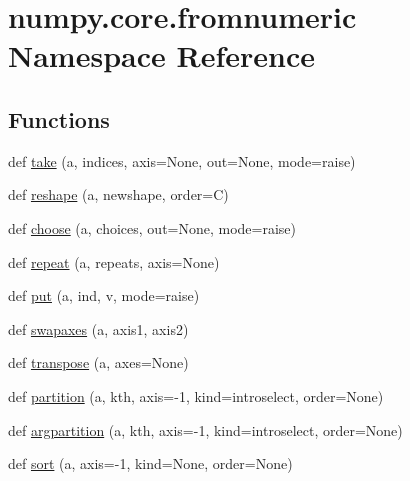 \hypertarget{namespacenumpy_1_1core_1_1fromnumeric}{}\section{numpy.\+core.\+fromnumeric Namespace Reference}
\label{namespacenumpy_1_1core_1_1fromnumeric}
\subsection*{Functions}
\begin{DoxyCompactItemize}
\item 
def \hyperlink{namespacenumpy_1_1core_1_1fromnumeric_a9ce1152680e42f10b320cc3bce091e82}{take} (a, indices, axis=None, out=None, mode=\textquotesingle{}raise\textquotesingle{})
\item 
def \hyperlink{namespacenumpy_1_1core_1_1fromnumeric_adc114e7baa60d8c41c25f59d83c8f731}{reshape} (a, newshape, order=\textquotesingle{}C\textquotesingle{})
\item 
def \hyperlink{namespacenumpy_1_1core_1_1fromnumeric_a8c4560c1ebb6f90c304bb49141f69ce3}{choose} (a, choices, out=None, mode=\textquotesingle{}raise\textquotesingle{})
\item 
def \hyperlink{namespacenumpy_1_1core_1_1fromnumeric_a59a57b8330d6d31653a0bd208323fe2a}{repeat} (a, repeats, axis=None)
\item 
def \hyperlink{namespacenumpy_1_1core_1_1fromnumeric_a649171e48bffb666b01e07b9687937fc}{put} (a, ind, v, mode=\textquotesingle{}raise\textquotesingle{})
\item 
def \hyperlink{namespacenumpy_1_1core_1_1fromnumeric_a40f6b355d941bebebf7e12e2dfd7c3af}{swapaxes} (a, axis1, axis2)
\item 
def \hyperlink{namespacenumpy_1_1core_1_1fromnumeric_aff97d74d47137201d26f209291f1f84a}{transpose} (a, axes=None)
\item 
def \hyperlink{namespacenumpy_1_1core_1_1fromnumeric_a7573136b0de8f6cdd27cd1f5219b476b}{partition} (a, kth, axis=-\/1, kind=\textquotesingle{}introselect\textquotesingle{}, order=None)
\item 
def \hyperlink{namespacenumpy_1_1core_1_1fromnumeric_ab2949c8fff4adc05f8845f9954146cfe}{argpartition} (a, kth, axis=-\/1, kind=\textquotesingle{}introselect\textquotesingle{}, order=None)
\item 
def \hyperlink{namespacenumpy_1_1core_1_1fromnumeric_ad2703582ce49137ac1907dca186ae171}{sort} (a, axis=-\/1, kind=None, order=None)

\end{DoxyCompactItemize}
